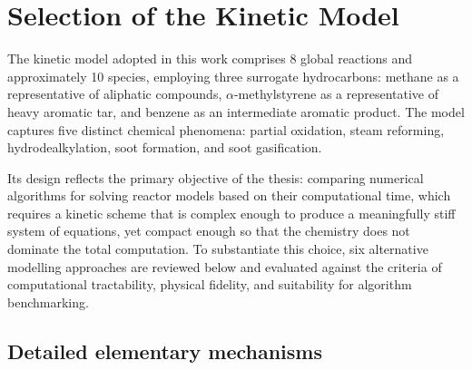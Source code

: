 \chapter{Selection of the Kinetic Model}\label{ch:kinetic_model}

The kinetic model adopted in this work comprises 8 global reactions and approximately 10 species, employing three surrogate hydrocarbons: methane as a representative of aliphatic compounds, \(\alpha\)-methylstyrene as a representative of heavy aromatic tar, and benzene as an intermediate aromatic product. The model captures five distinct chemical phenomena: partial oxidation, steam reforming, hydrodealkylation, soot formation, and soot gasification.

Its design reflects the primary objective of the thesis: comparing numerical algorithms for solving reactor models based on their computational time, which requires a kinetic scheme that is complex enough to produce a meaningfully stiff system of equations, yet compact enough so that the chemistry does not dominate the total computation. To substantiate this choice, six alternative modelling approaches are reviewed below and evaluated against the criteria of computational tractability, physical fidelity, and suitability for algorithm benchmarking.

\section{Detailed elementary mechanisms}\label{sec:detailed_mechanisms}

